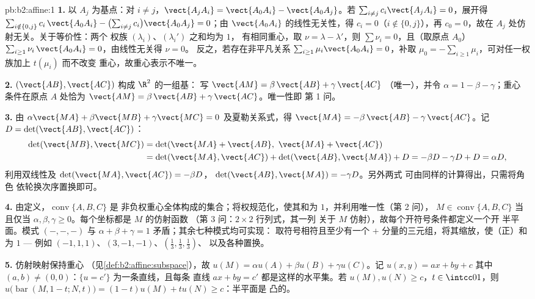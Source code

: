 \begin{solution}{pb:b2:affine:1}
\textbf{1.} 以 $A_j$ 为基点：对 $i \neq j$，$\vect{A_jA_i} =
\vect{A_0A_i} - \vect{A_0A_j}$。若 $\sum_{i \neq j}
c_i\vect{A_jA_i} = 0$，展开得 $\sum_{i \notin \{0,
j\}} c_i\,\vect{A_0A_i} - \bigl(\sum_{i\neq j}
c_i\bigr)\vect{A_0A_j} = 0$；由
$\vect{A_0A_i}$ 的线性无关性，得 $c_i = 0$（$i \notin \{0, j\}$），再
$c_0 = 0$，故在 $A_j$ 处仿射无关。关于等价性：两个
权族 $(\lambda_i)$、$(\lambda_i')$ 之和均为 $1$，
有相同重心，取 $\nu = \lambda -
\lambda'$，则 $\sum\nu_i = 0$，且（取原点 $A_0$）$\sum_{i \geq
1}\nu_i\,\vect{A_0A_i} = 0$，由线性无关得 $\nu = 0$。
反之，若存在非平凡关系 $\sum_{i\geq1}\mu_i
\vect{A_0A_i} = 0$，补取 $\mu_0 = -\sum_{i\geq1}
\mu_i$，可对任一权族加上 $t(\mu_i)$ 而不改变
重心，故重心表示不唯一。

\textbf{2.} $(\vect{AB}, \vect{AC})$ 构成 $\R^2$ 的一组基：
写 $\vect{AM} = \beta\,\vect{AB} + \gamma\,\vect{AC}$
（唯一），并令 $\alpha = 1 - \beta - \gamma$；重心
条件在原点 $A$ 处恰为 $\vect{AM} =
\beta\,\vect{AB} + \gamma\,\vect{AC}$。唯一性即
第 1 问。

\textbf{3.} 由 $\alpha\vect{MA} + \beta\vect{MB} +
\gamma\vect{MC} = 0$ 及夏勒关系式，得 $\vect{MA} =
-\beta\,\vect{AB} - \gamma\,\vect{AC}$。记 $D =
\det(\vect{AB}, \vect{AC})$：
\begin{align*}
\det(\vect{MB}, \vect{MC})
&= \det(\vect{MA} + \vect{AB},\ \vect{MA} + \vect{AC})\\
&= \det(\vect{MA}, \vect{AC}) + \det(\vect{AB}, \vect{MA}) +
D = -\beta D - \gamma D + D = \alpha D,
\end{align*}
利用双线性及 $\det(\vect{MA}, \vect{AC}) = -\beta D$，
$\det(\vect{AB}, \vect{MA}) = -\gamma D$。另外两式
可由同样的计算得出，只需将角色
依轮换次序置换即可。

\textbf{4.} 由定义，$\operatorname{conv}\{A, B, C\}$ 是
非负权重心全体构成的集合；将权规范化，使其和为
$1$，并利用唯一性（第 2 问），
$M \in \operatorname{conv}\{A,B,C\}$ 当且仅当 $\alpha, \beta,
\gamma \geq 0$。每个坐标都是 $M$ 的仿射函数
（第 3 问：$2\times2$ 行列式，其一列
关于 $M$ 仿射），故每个开符号条件都定义一个开
半平面。模式 $(-,-,-)$ 与 $\alpha + \beta
+ \gamma = 1$ 矛盾；其余七种模式均可实现：
取符号相符且至少有一个
$+$ 分量的三元组，将其缩放，使（正）和为 $1$ --- 例如
$(-1, 1, 1)$、$(3, -1, -1)$、$(\frac13, \frac13, \frac13)$、
以及各种置换。

\textbf{5.} 仿射映射保持重心
（见\cref{def:b2:affine:subspace}），故 $u(M) = \alpha u(A) +
\beta u(B) + \gamma u(C)$。记 $u(x, y) = ax + by + c$
其中 $(a, b) \neq (0,0)$：$\{u = c'\}$ 为一条直线，且每条
直线 $ax + by = c'$ 都是这样的水平集。若 $u(M), u(N) \geq
c$，$t \in \intcc01$，则 $u\bigl(\operatorname{bar}(M,
1-t; N, t)\bigr) = (1-t)u(M) + tu(N) \geq c$：半平面是
凸的。


\end{solution}
